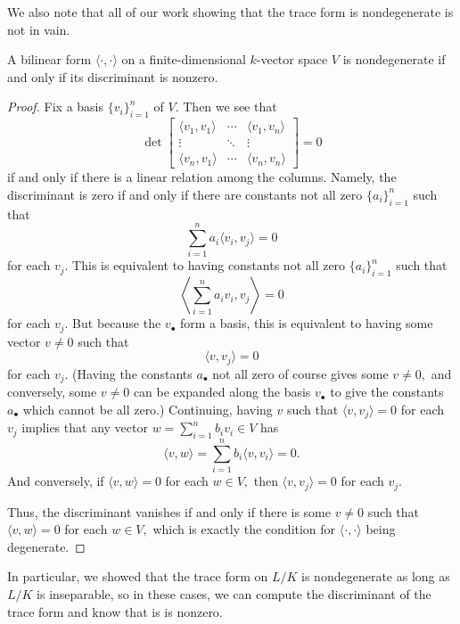\documentclass[../notes.tex]{subfiles}
\begin{document}
We also note that all of our work showing that the trace form is nondegenerate is not in vain.
\begin{lemma}
	A bilinear form $\langle\cdot,\cdot\rangle$ on a finite-dimensional $k$-vector space $V$ is nondegenerate if and only if its discriminant is nonzero.
\end{lemma}
\begin{proof}
	Fix a basis $\{v_i\}_{i=1}^n$ of $V.$ Then we see that
	\[\det\begin{bmatrix}
		\langle v_1,v_1\rangle & \cdots & \langle v_1,v_n\rangle \\
		\vdots & \ddots & \vdots \\
		\langle v_n,v_1\rangle & \cdots & \langle v_n,v_n\rangle
	\end{bmatrix}=0\]
	if and only if there is a linear relation among the columns. Namely, the discriminant is zero if and only if there are constants not all zero $\{a_i\}_{i=1}^n$ such that
	\[\sum_{i=1}^na_i\langle v_i,v_j\rangle=0\]
	for each $v_j.$ This is equivalent to having constants not all zero $\{a_i\}_{i=1}^n$ such that
	\[\left\langle\sum_{i=1}^na_iv_i,v_j\right\rangle=0\]
	for each $v_j.$ But because the $v_\bullet$ form a basis, this is equivalent to having some vector $v\ne0$ such that
	\[\langle v,v_j\rangle=0\]
	for each $v_j.$ (Having the constants $a_\bullet$ not all zero of course gives some $v\ne0,$ and conversely, some $v\ne0$ can be expanded along the basis $v_\bullet$ to give the constants $a_\bullet$ which cannot be all zero.) Continuing, having $v$ such that $\langle v,v_j\rangle=0$ for each $v_j$ implies that any vector $w=\sum_{i=1}^nb_iv_i\in V$ has
	\[\langle v,w\rangle=\sum_{i=1}^nb_i\langle v,v_i\rangle=0.\]
	And conversely, if $\langle v,w\rangle=0$ for each $w\in V,$ then $\langle v,v_j\rangle=0$ for each $v_j.$

	Thus, the discriminant vanishes if and only if there is some $v\ne0$ such that $\langle v,w\rangle=0$ for each $w\in V,$ which is exactly the condition for $\langle\cdot,\cdot\rangle$ being degenerate.
\end{proof}
In particular, we showed that the trace form on $L/K$ is nondegenerate as long as $L/K$ is inseparable, so in these cases, we can compute the discriminant of the trace form and know that is is nonzero.
\end{document}
